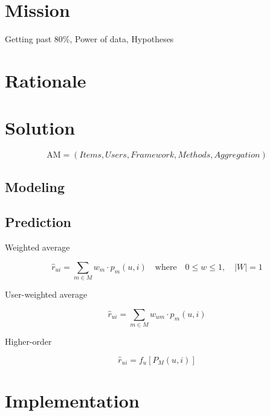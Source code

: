 \section{Mission}

Getting past 80\%,
Power of data,
Hypotheses

\section{Rationale}

\section{Solution}

\begin{equation*}
  \mathrm{AM} = (Items, Users, Framework, Methods, Aggregation)
\end{equation*}


\subsection{Modeling}
\subsection{Prediction}

Weighted average

\begin{equation*}
  \hat{r}_{ui} = \sum_{m \in M} w_m \cdot p_m(u,i) 
  \quad \text{where}
  \quad 0 \leq w \leq 1, 
  \quad |W| = 1
\end{equation*}


User-weighted average

\begin{equation*}
  \hat{r}_{ui} = \sum_{m \in M} w_{um} \cdot p_m(u,i)
\end{equation*}


Higher-order

\begin{equation*}
  \hat{r}_{ui} = f_{u}[ P_{M}(u,i) ]
\end{equation*}





\section{Implementation}      



